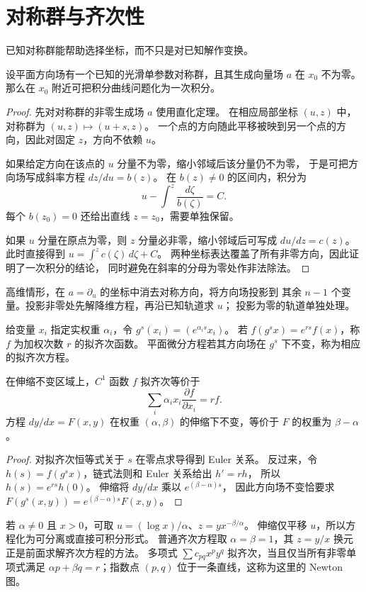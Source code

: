 \section{对称群与齐次性}
已知对称群能帮助选择坐标，而不只是对已知解作变换。
\begin{theorem}
设平面方向场有一个已知的光滑单参数对称群，且其生成向量场 $a$ 在 $x_0$ 不为零。
那么在 $x_0$ 附近可把积分曲线问题化为一次积分。
\end{theorem}
\begin{proof}
先对对称群的非零生成场 $a$ 使用直化定理。
在相应局部坐标 $(u,z)$ 中，对称群为 $(u,z)\mapsto(u+s,z)$。
一个点的方向随此平移被映到另一个点的方向，因此对固定 $z$，方向不依赖 $u$。

如果给定方向在该点的 $u$ 分量不为零，缩小邻域后该分量仍不为零，
于是可把方向场写成斜率方程 $dz/du=b(z)$。
在 $b(z)\ne0$ 的区间内，积分为
\[
 u-\int^z\frac{d\zeta}{b(\zeta)}=C.
\]
每个 $b(z_0)=0$ 还给出直线 $z=z_0$，需要单独保留。

如果 $u$ 分量在原点为零，则 $z$ 分量必非零，缩小邻域后可写成
$du/dz=c(z)$。此时直接得到 $u=\displaystyle\int^zc(\zeta)\,d\zeta+C$。
两种坐标表达覆盖了所有非零方向，因此证明了一次积分的结论，
同时避免在斜率的分母为零处作非法除法。
\end{proof}
高维情形，在 $a=\partial_u$ 的坐标中消去对称方向，将方向场投影到
其余 $n-1$ 个变量。投影非零处先解降维方程，再沿已知轨道求 $u$；
投影为零的轨道单独处理。

\begin{definition}[加权伸缩]
给变量 $x_i$ 指定实权重 $\alpha_i$，令
$g^s(x_i)=(e^{\alpha_i s}x_i)$。
若 $f(g^sx)=e^{rs}f(x)$，称 $f$ 为加权次数 $r$ 的拟齐次函数。
平面微分方程若其方向场在 $g^s$ 下不变，称为相应的拟齐次方程。
\end{definition}
\begin{proposition}
在伸缩不变区域上，$C^1$ 函数 $f$ 拟齐次等价于
\[
 \sum_i\alpha_ix_i\frac{\partial f}{\partial x_i}=rf.
\]
方程 $dy/dx=F(x,y)$ 在权重 $(\alpha,\beta)$ 的伸缩下不变，等价于
$F$ 的权重为 $\beta-\alpha$。
\end{proposition}
\begin{proof}
对拟齐次恒等式关于 $s$ 在零点求导得到 Euler 关系。
反过来，令 $h(s)=f(g^sx)$，链式法则和 Euler 关系给出 $h'=rh$，
所以 $h(s)=e^{rs}h(0)$。
伸缩将 $dy/dx$ 乘以 $e^{(\beta-\alpha)s}$，
因此方向场不变恰要求 $F(g^s(x,y))=e^{(\beta-\alpha)s}F(x,y)$。
\end{proof}
若 $\alpha\ne0$ 且 $x>0$，可取
$u=(\log x)/\alpha$、$z=yx^{-\beta/\alpha}$。
伸缩仅平移 $u$，所以方程化为可分离或直接可积分形式。
普通齐次方程取 $\alpha=\beta=1$，其 $z=y/x$ 换元正是前面求解齐次方程的方法。
多项式 $\sum c_{pq}x^py^q$ 拟齐次，当且仅当所有非零单项式满足
$\alpha p+\beta q=r$；指数点 $(p,q)$ 位于一条直线，这称为这里的 Newton 图。

